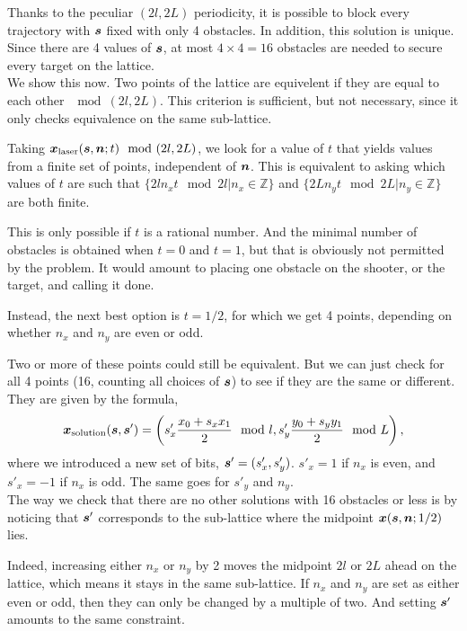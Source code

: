 \documentclass[12pt]{article}
\begin{document}
Thanks to the peculiar $(2l, 2L)$ periodicity, it is
possible to block every trajectory with $\vb*{s}$ fixed with
only 4 obstacles. In addition, this solution is unique.
Since there are 4 values of $\vb*{s}$, at most $4\times4=16$
obstacles are needed to secure every target on the lattice.\\


We show this now. Two points of the lattice are equivelent
if they are equal to each other $\mod{(2l,2L)}$. This
criterion is sufficient, but not necessary, since it only
checks equivalence on the same sub-lattice.

Taking $\vb*{x}_\text{laser}(\vb*{s},
\vb*{n};t)\mod{(2l,2L)}$, we look for a value of $t$ that
yields values from a finite set of points, independent of
$\vb*{n}$. This is equivalent to asking which values of $t$
are such that $\{2ln_xt\mod{2l}|n_x\in\mathbb{Z}\}$ and
$\{2Ln_yt\mod{2L}|n_y\in\mathbb{Z}\}$ are both finite.

This is only possible if $t$ is a rational number. And the
minimal number of obstacles is obtained when $t=0$ and
$t=1$, but that is obviously not permitted by the problem.
It would amount to placing one obstacle on the shooter, or
the target, and calling it done.

Instead, the next best option is $t=1/2$, for which we get 4
points, depending on whether $n_x$ and $n_y$ are even or
odd.

Two or more of these points could still be equivalent. But
we can just check for all 4 points (16, counting all choices
of $\vb*{s}$) to see if they are the same or different. They
are given by the formula,
\begin{equation}
    \vb*{x}_\text{solution}(\vb*{s},\vb*{s}') =
        \left(
            s'_x\frac{x_0 + s_xx_1}{2} \mod{l},
            s'_y\frac{y_0 + s_yy_1}{2} \mod{L}
        \right),
    \label{eq:solution}
\end{equation}
where we introduced a new set of bits,
$\vb*{s}'=(s'_x,s'_y)$. $s'_x=1$ if $n_x$ is even, and
$s'_x=-1$ if $n_x$ is odd.  The same goes for $s'_y$ and
$n_y$.\\

The way we check that there are no other solutions with 16
obstacles or less is by noticing that $\vb*{s}'$ corresponds
to the sub-lattice where the midpoint $\vb*{x}(\vb*{s},
\vb*{n}; 1/2)$ lies.

Indeed, increasing either $n_x$ or $n_y$ by 2 moves the
midpoint $2l$ or $2L$ ahead on the lattice, which means it
stays in the same sub-lattice. If $n_x$ and $n_y$ are set as
either even or odd, then they can only be changed by a
multiple of two. And setting $\vb*{s}'$ amounts to the same
constraint.
\end{document}
